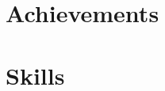 \documentclass[letterpaper,11pt]{article}
\begin{document}
\section{Achievements}
    \resumeSubHeadingListStart
        
        
    \resumeSubHeadingListEnd

\section{Skills}
    \resumeParagraphStart
        
    \resumeParagraphEnd
\end{document}
